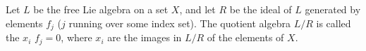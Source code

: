 Let $L$ be the free Lie algebra on a set $X$, and let $R$ be the ideal of $L$ generated by elements $f_j$ ($j$ running over some index set). The quotient algebra $L/R$ is called the  $x_i$  $f_j = 0$, where $x_i$ are the images in $L/R$ of the elements of $X$.
